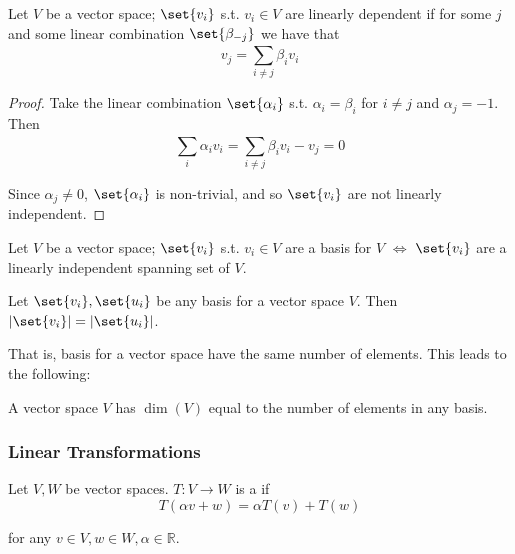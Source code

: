 \documentclass{article}
\begin{document}
\begin{theorem}
  Let $V$ be a vector space; $\set{v_i}$ s.t. $v_i \in V$ are linearly dependent if for some $j$ and some linear combination $\set{\beta_{-j}}$ we have that
  \[
    v_j = \sum^{}_{i \ne j} \beta_i v_i
  \]
\end{theorem}

\begin{proof}
  Take the linear combination $\set{\alpha_i}$ s.t. $\alpha_i = \beta_i$ for $i \ne j$ and $\alpha_j = -1$. Then
  \[
    \sum^{}_{i} \alpha_i v_i
    =
    \sum^{}_{i \ne j} \beta_i v_i - v_j
    =
    0
  \]

  Since $\alpha_j \ne 0$, $\set{\alpha_i}$ is non-trivial, and so $\set{v_i}$ are not linearly independent.
\end{proof}

\begin{theorem}
  Let $V$ be a vector space; $\set{v_i}$ s.t. $v_i \in V$ are a basis for $V$ $\iff$ $\set{v_i}$ are a linearly independent spanning set of $V$.
\end{theorem}

\begin{claim}
  Let $\set{v_i}, \set{u_i}$ be any basis for a vector space $V$. Then $|\set{v_i}| = |\set{u_i}|$.
\end{claim}

That is, basis for a vector space have the same number of elements. This leads to the following:
\begin{definition}
  A vector space $V$ has  $\dim(V)$ equal to the number of elements in any basis.
\end{definition}

\subsubsection{Linear Transformations}
\label{ssub:linear_transformations}

\begin{definition}
  Let $V, W$ be vector spaces. $T: V \to W$ is a  if
  \[
    T(\alpha v + w) = \alpha T(v) + T(w)
  \]

  for any $v \in V, w \in W, \alpha \in \mathbb{R}$.
\end{definition}
\end{document}
